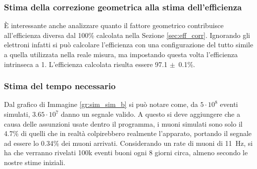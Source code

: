\subsubsection{Stima della correzione geometrica alla stima dell'efficienza}
\`E interessante anche analizzare quanto il fattore geometrico contribuisce all'efficienza diversa dal 100\% calcolata nella Sezione \ref{sec:eff_corr}. Ignorando gli elettroni infatti si pu\`o calcolare l'efficienza con una configurazione del tutto simile a quella utilizzata nella reale misura, ma impostando questa volta l'efficienza intrinseca a 1. L'efficienza calcolata risulta essere 97.1 $\pm$~0.1\%.

\subsubsection{Stima del tempo necessario}
Dal grafico di Immagine \ref{gr:sim_sim_b} si pu\`o notare come, da $5\cdot 10^8$ eventi simulati, $3.65\cdot 10^7$ danno un segnale valido. A questo si deve aggiungere che a causa delle assunzioni usate dentro il programma, i muoni simulati sono solo il 4.7\% di quelli che in realt\`a colpirebbero realmente l'apparato, portando il segnale ad essere lo 0.34\% dei muoni arrivati. Considerando un rate di muoni di 11~Hz, si ha che verranno rivelati 100k eventi buoni ogni 8 giorni circa, almeno secondo le nostre stime iniziali.
